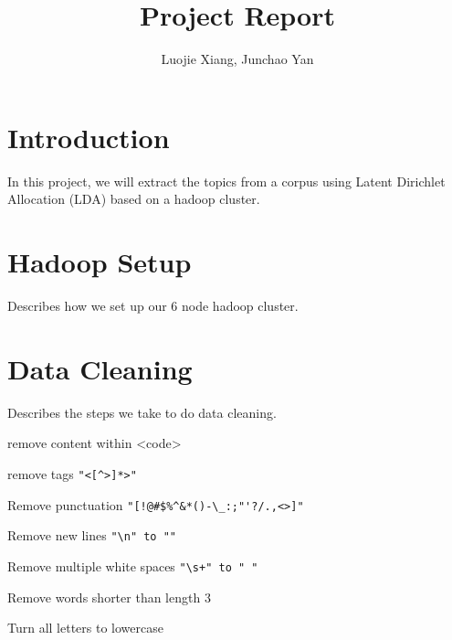 \documentclass{article}
\begin{document}
\title{Project Report}
\author{Luojie Xiang, Junchao Yan}
\date{}
\maketitle

\section{Introduction}
In this project, we will extract the topics from a corpus using Latent Dirichlet Allocation (LDA) based on a hadoop cluster.  
\section{Hadoop Setup}

Describes how we set up our 6 node hadoop cluster.

\section{Data Cleaning}

Describes the steps we take to do data cleaning.

remove content within <code>

remove tags \verb+"<[^>]*>"+

Remove punctuation \verb+"[!@#$%^&*()-\_:;"'?/.,<>]"+

Remove new lines \verb+"\n" to ""+

Remove multiple white spaces \verb-"\s+" to " "-

Remove words shorter than length 3

Turn all letters to lowercase
\end{document}
